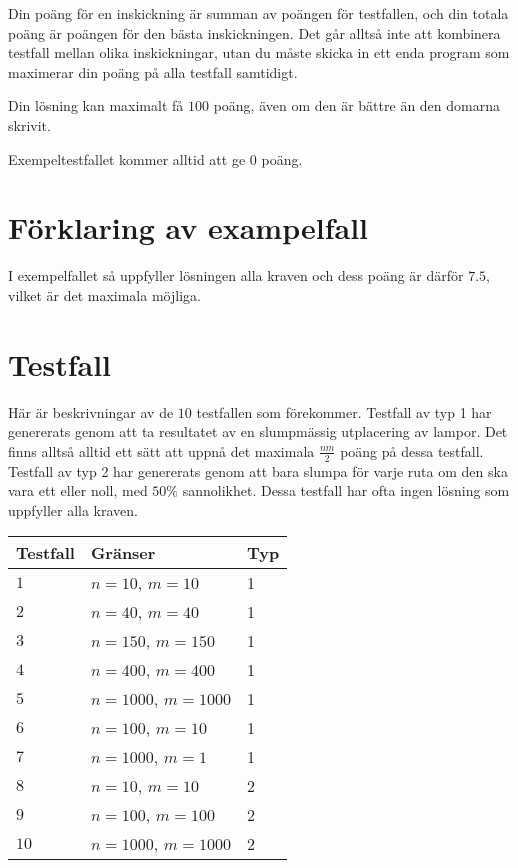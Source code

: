 Din poäng för en inskickning är summan av poängen för testfallen, och din totala poäng är poängen för den bästa inskickningen.
Det går alltså inte att kombinera testfall mellan olika inskickningar, utan du måste skicka in ett enda program som
maximerar din poäng på alla testfall samtidigt.

Din lösning kan maximalt få $100$ poäng, även om den är bättre än den domarna skrivit.

Exempeltestfallet kommer alltid att ge $0$ poäng.


\section*{Förklaring av exampelfall}
I exempelfallet så uppfyller lösningen alla kraven och dess poäng är därför $7.5$, vilket är det
maximala möjliga.

\section*{Testfall}
Här är beskrivningar av de $10$ testfallen som förekommer.
Testfall av typ 1 har genererats genom att ta resultatet av en slumpmässig utplacering av lampor.
Det finns alltså alltid ett sätt att uppnå det maximala $\frac{nm}{2}$ poäng på dessa testfall.
Testfall av typ 2 har genererats genom att bara slumpa för varje ruta om den ska vara ett eller noll,
med $50\%$ sannolikhet. Dessa testfall har ofta ingen lösning som uppfyller alla kraven.

\noindent
\begin{tabular}{| l | l | l |}
\hline
Testfall & Gränser                                     & Typ  \\ \hline
$1$       & $n = 10$, $m = 10$                           & 1  \\ \hline
$2$       & $n = 40$, $m = 40$                           & 1   \\ \hline
$3$       & $n = 150$, $m = 150$                           & 1   \\ \hline
$4$       & $n = 400$, $m = 400$                          & 1  \\ \hline
$5$       & $n = 1000$, $m = 1000$                          & 1   \\ \hline
$6$       & $n = 100$, $m = 10$                           & 1   \\ \hline
$7$       & $n = 1000$, $m = 1$                           & 1   \\ \hline
$8$       & $n = 10$, $m = 10$                           & 2  \\ \hline
$9$       & $n = 100$, $m = 100$                      & 2   \\ \hline
$10$      & $n = 1000$, $m = 1000$                       & 2   \\ \hline
\end{tabular}
